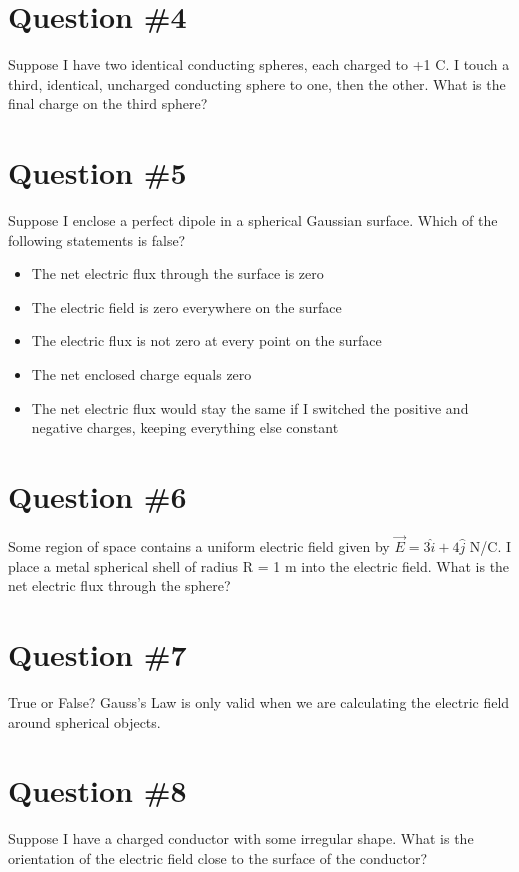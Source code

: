 \documentclass[12pt]{article}
\begin{document}
\section*{Question \#4}
Suppose I have two identical conducting spheres, each charged to +1 C.  I touch a third, identical, uncharged conducting sphere to one, then the other.  What is the final charge on the third sphere?

\section*{Question \#5}
Suppose I enclose a perfect dipole in a spherical Gaussian surface.  Which of the following statements is false?

\begin{itemize}
\item The net electric flux through the surface is zero
\item The electric field is zero everywhere on the surface
\item The electric flux is not zero at every point on the surface
\item The net enclosed charge equals zero
\item  The net electric flux would stay the same if I switched the positive and negative charges, keeping everything else constant
\end{itemize}

\section*{Question \#6}
Some region of space contains a uniform electric field given by $\vec{E} = 3\hat{i} + 4\hat{j}$ N/C.  I place a metal spherical shell of radius R = 1 m into the electric field.  What is the net electric flux through the sphere?

\section*{Question \#7}
True or False?  Gauss's Law is only valid when we are calculating the electric field around spherical objects.

\section*{Question \#8}
Suppose I have a charged conductor with some irregular shape.  What is the orientation of the electric field close to the surface of the conductor?
\end{document}
